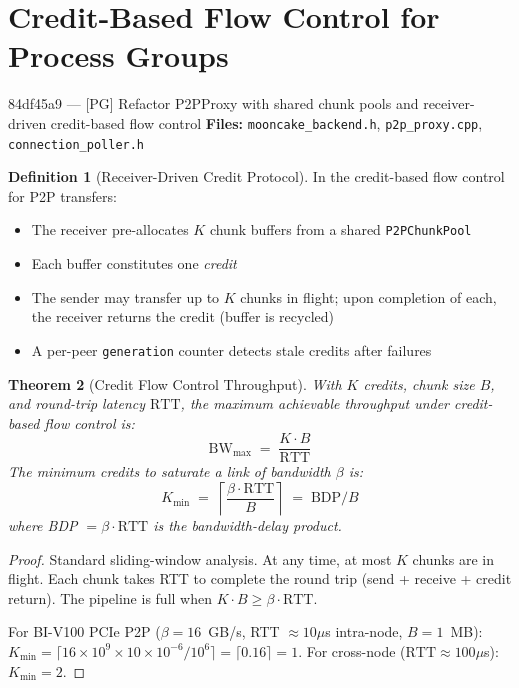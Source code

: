 \documentclass[11pt,a4paper,twoside]{article}
\theoremstyle{plain}
\newtheorem{theorem}{Theorem}[section]
\theoremstyle{definition}
\newtheorem{definition}[theorem]{Definition}
\theoremstyle{remark}
\begin{document}
\section{Credit-Based Flow Control for Process Groups}
\label{sec:credit-flow}

\begin{commitbox}{84df45a9 --- [PG] Refactor P2PProxy with shared chunk pools and
receiver-driven credit-based flow control}
\textbf{Files:} \texttt{mooncake\_backend.h}, \texttt{p2p\_proxy.cpp},
\texttt{connection\_poller.h}
\end{commitbox}

\begin{definition}[Receiver-Driven Credit Protocol]
\label{def:credit}
In the credit-based flow control for P2P transfers:
\begin{itemize}[nosep]
  \item The receiver pre-allocates $K$ chunk buffers from a shared \texttt{P2PChunkPool}
  \item Each buffer constitutes one \textit{credit}
  \item The sender may transfer up to $K$ chunks in flight; upon completion of each,
    the receiver returns the credit (buffer is recycled)
  \item A per-peer \texttt{generation} counter detects stale credits after failures
\end{itemize}
\end{definition}

\begin{theorem}[Credit Flow Control Throughput]
\label{thm:credit-flow}
With $K$ credits, chunk size $B$, and round-trip latency $\text{RTT}$, the
maximum achievable throughput under credit-based flow control is:
\begin{equation}
  \text{BW}_{\text{max}} \;=\; \frac{K \cdot B}{\text{RTT}}
\end{equation}
The minimum credits to saturate a link of bandwidth $\beta$ is:
\begin{equation}
  K_{\min} \;=\; \left\lceil \frac{\beta \cdot \text{RTT}}{B} \right\rceil
  \;=\; \text{BDP} / B
\end{equation}
where BDP $= \beta \cdot \text{RTT}$ is the bandwidth-delay product.
\end{theorem}

\begin{proof}
Standard sliding-window analysis. At any time, at most $K$ chunks are in flight.
Each chunk takes RTT to complete the round trip (send + receive + credit return).
The pipeline is full when $K \cdot B \geq \beta \cdot \text{RTT}$.

For BI-V100 PCIe P2P ($\beta = 16$~GB/s, RTT $\approx 10\mu$s intra-node,
$B = 1$~MB): $K_{\min} = \lceil 16 \times 10^9 \times 10 \times 10^{-6} / 10^6 \rceil
= \lceil 0.16 \rceil = 1$. For cross-node ($\text{RTT} \approx 100\mu$s):
$K_{\min} = 2$.
\end{proof}
\end{document}
